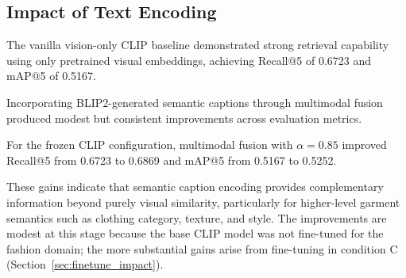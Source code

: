 \documentclass[11pt,a4paper]{article}
\begin{document}
\begin{table}[H]
\centering
\caption{mAP@K Performance Across Ablation Settings}
\label{tab:map_results}
\end{table}

\subsection{Impact of Text Encoding}

The vanilla vision-only CLIP baseline demonstrated strong retrieval capability using only pretrained visual embeddings, achieving Recall@5 of 0.6723 and mAP@5 of 0.5167.

Incorporating BLIP2-generated semantic captions through multimodal fusion produced modest but consistent improvements across evaluation metrics.

For the frozen CLIP configuration, multimodal fusion with $\alpha = 0.85$ improved Recall@5 from 0.6723 to 0.6869 and mAP@5 from 0.5167 to 0.5252.

These gains indicate that semantic caption encoding provides complementary information beyond purely visual similarity, particularly for higher-level garment semantics such as clothing category, texture, and style. The improvements are modest at this stage because the base CLIP model was not fine-tuned for the fashion domain; the more substantial gains arise from fine-tuning in condition C (Section~\ref{sec:finetune_impact}).
\end{document}
